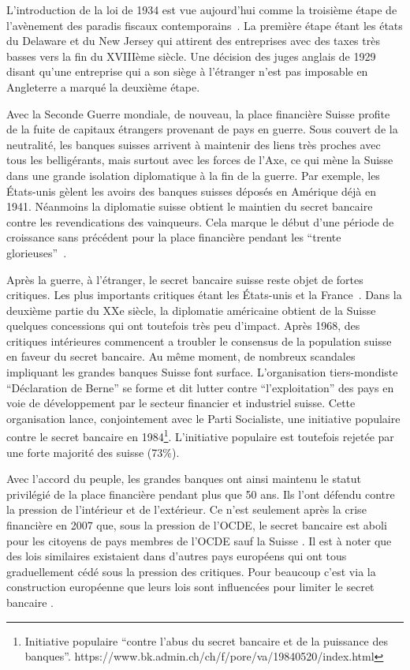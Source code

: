 \documentclass[11pt]{article}
\begin{document}
L'introduction de la loi de 1934 est vue aujourd'hui comme la troisième étape de
l'avènement des paradis fiscaux contemporains~\citep[p. 29]{Chavagneux12}. La
première étape étant les états du Delaware et du New Jersey qui attirent des
entreprises avec des taxes très basses vers la fin du XVIIIème siècle. Une
décision des juges anglais de 1929 disant qu'une entreprise qui a son siège à
l'étranger n'est pas imposable en Angleterre a marqué la deuxième étape.


Avec la Seconde Guerre mondiale, de nouveau, la place financière Suisse profite
de la fuite de capitaux étrangers provenant de pays en guerre. Sous couvert de
la neutralité, les banques suisses arrivent à maintenir des liens très proches
avec tous les belligérants, mais surtout avec les forces de l’Axe, ce qui mène
la Suisse dans une grande isolation diplomatique à la fin de la guerre. Par
exemple, les États-unis gèlent les avoirs des banques suisses déposés en
Amérique déjà en 1941. Néanmoins la diplomatie suisse obtient le maintien du
secret bancaire contre les revendications des vainqueurs. Cela marque le début
d’une période de croissance sans précédent pour la place financière pendant les
 ``trente glorieuses''~\citep[p. 495]{Mazbouri12}.

Après la guerre, à l'étranger, le secret bancaire suisse reste objet de fortes
critiques. Les plus importants critiques étant les États-unis et la
France~\citep[p. 503]{Mazbouri12}. Dans la deuxième partie du XXe siècle, la
diplomatie américaine obtient de la Suisse quelques concessions qui ont
toutefois très peu d'impact. Après 1968, des critiques intérieures commencent a
troubler le consensus de la population suisse en faveur du secret bancaire. Au
même moment, de nombreux scandales impliquant les grandes banques Suisse font
surface. L’organisation tiers-mondiste “Déclaration de Berne” \citep{EvB} se
forme et dit lutter contre ``l'exploitation'' des pays en voie de développement
par le secteur financier et industriel suisse. Cette organisation lance,
conjointement avec le Parti Socialiste, une initiative populaire contre le
secret bancaire en 1984\footnote{Initiative populaire ``contre l'abus du secret
bancaire et de la puissance des banques''.
https://www.bk.admin.ch/ch/f/pore/va/19840520/index.html}. L'initiative
populaire est toutefois rejetée par une forte majorité des suisse (73\%).

Avec l'accord du peuple, les grandes banques ont ainsi maintenu le
statut privilégié de la place financière pendant plus que 50 ans. Ils l’ont
défendu contre la pression de l’intérieur et de l’extérieur. Ce n’est
seulement après la crise financière en 2007 que, sous la pression de l'OCDE,
le secret bancaire est aboli pour les citoyens de pays membres de l'OCDE
sauf la Suisse \citep{NeufVies}.
Il est à noter que des lois similaires existaient dans d'autres pays européens
qui ont tous graduellement cédé sous la pression des critiques. Pour beaucoup
c'est via la construction européenne que leurs lois sont influencées pour
limiter le secret bancaire \citep[p. 32]{Palan09}.
\end{document}
